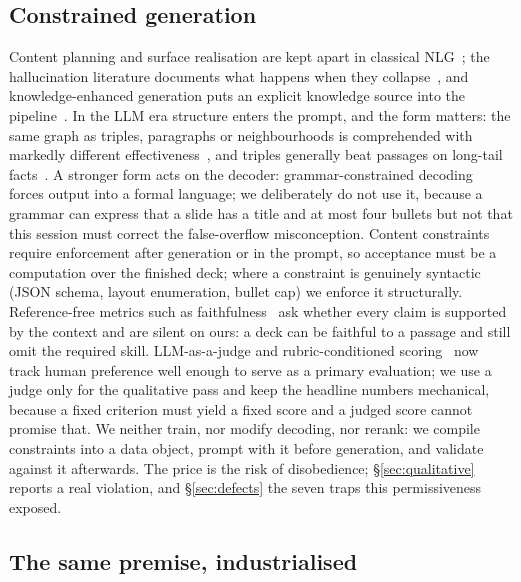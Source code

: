 \documentclass[review,12pt]{elsarticle}
\renewcommand{\_}{\kgunderscore\allowbreak}
\begin{document}
\subsection{Constrained generation}

Content planning and surface realisation are kept apart in classical
NLG~\cite{dong2022nlg}; the hallucination literature documents what happens
when they collapse~\cite{ji2023hallucination}, and knowledge-enhanced
generation puts an explicit knowledge source into the pipeline~\cite{yu2022knowledge}.
In the LLM era structure enters the prompt, and the form matters: the same
graph as triples, paragraphs or neighbourhoods is comprehended with markedly
different effectiveness~\cite{dai2025kg}, and triples generally beat passages
on long-tail facts~\cite{huang2025longtail}. A stronger form acts on the
decoder: grammar-constrained decoding~\cite{geng2023grammar} forces output into
a formal language; we deliberately do not use it, because a grammar can express
that a slide has a title and at most four bullets but not that this session
must correct the false-overflow misconception. Content constraints require
enforcement after generation or in the prompt, so acceptance must be a
computation over the finished deck; where a constraint is genuinely syntactic
(JSON schema, layout enumeration, bullet cap) we enforce it structurally.
Reference-free metrics such as faithfulness~\cite{es2024ragas} ask whether
every claim is supported by the context and are silent on ours: a deck can be
faithful to a passage and still omit the required skill. LLM-as-a-judge and
rubric-conditioned scoring~\cite{zheng2023judging,liu2023geval} now track human
preference well enough to serve as a primary evaluation; we use a judge only
for the qualitative pass and keep the headline numbers mechanical, because a
fixed criterion must yield a fixed score and a judged score cannot promise
that. We neither train, nor modify decoding, nor rerank: we compile
constraints into a data object, prompt with it before generation, and validate
against it afterwards. The price is the risk of disobedience;
\S\ref{sec:qualitative} reports a real violation, and \S\ref{sec:defects} the
seven traps this permissiveness exposed.

\subsection{The same premise, industrialised}
\label{sec:learningcommons}
\end{document}

